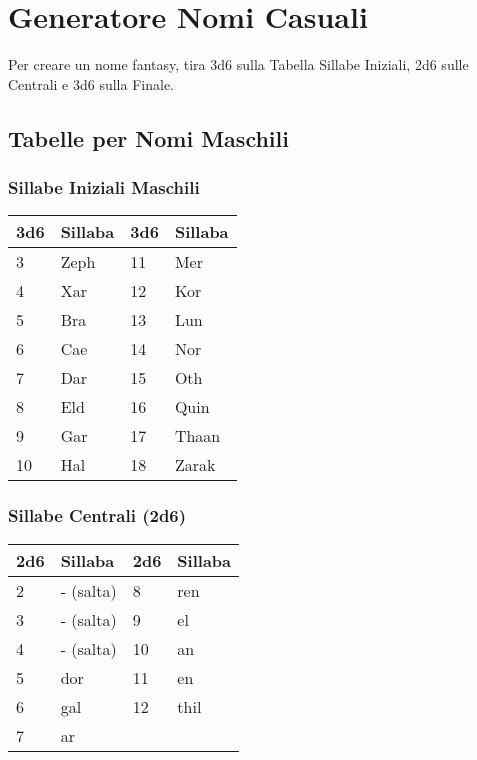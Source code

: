 \section{Generatore Nomi Casuali}

\begin{multicols}{2}

Per creare un nome fantasy, tira 3d6 sulla Tabella Sillabe Iniziali, 2d6 sulle Centrali e 3d6 sulla Finale.

{\small

\subsection*{Tabelle per Nomi Maschili}

\subsubsection*{Sillabe Iniziali Maschili}
\noindent\begin{tabularx}{\linewidth}{X|l|X|l}
	\toprule
\rowcolor{gray!20}\textbf{3d6} & \textbf{Sillaba} & \textbf{3d6} & \textbf{Sillaba} \\
\toprule
3 & Zeph & 11 & Mer \\
\rowcolor{gray!20}4 & Xar & 12 & Kor \\
5 & Bra &    13 & Lun      \\
\rowcolor{gray!20}6 & Cae & 14 & Nor     \\
7 & Dar & 15 & Oth      \\
\rowcolor{gray!20}8 & Eld &  16 & Quin \\
9 & Gar  & 17 & Thaan \\
\rowcolor{gray!20}10 & Hal &  18 & Zarak  \\
\end{tabularx}


\subsubsection*{Sillabe Centrali (2d6)}
\noindent\begin{tabularx}{\linewidth}{X|l|X|l}
	\toprule
\rowcolor{gray!20}\textbf{2d6} & \textbf{Sillaba} & \textbf{2d6} & \textbf{Sillaba} \\
\toprule
2 & - (salta) & 8 & ren \\
\rowcolor{gray!20}3 & - (salta) & 9 & el \\
4 & - (salta) & 10 & an \\
\rowcolor{gray!20}5 & dor & 11 & en \\
6 & gal & 12 & thil \\
\rowcolor{gray!20}7 & ar & & \\
\end{tabularx}


}
\end{multicols}

